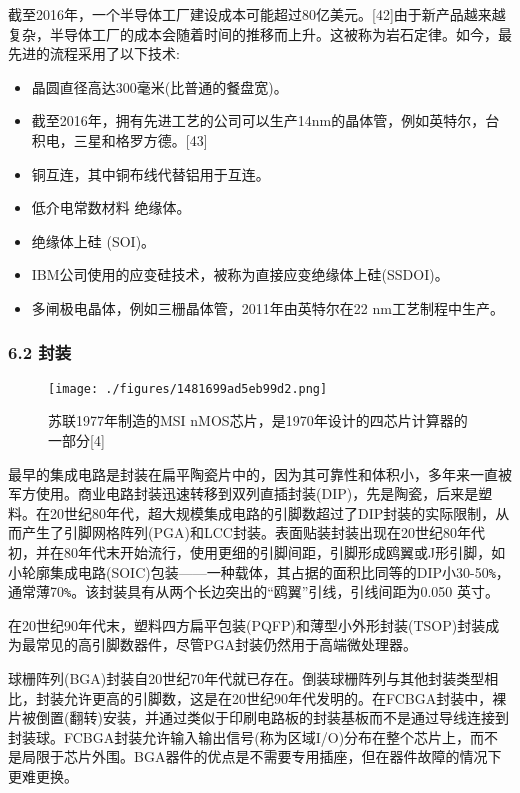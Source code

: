 截至2016年，一个半导体工厂建设成本可能超过80亿美元。[42]由于新产品越来越复杂，半导体工厂的成本会随着时间的推移而上升。这被称为岩石定律。如今，最先进的流程采用了以下技术:

\begin{itemize}
\item 晶圆直径高达300毫米(比普通的餐盘宽)。
\item 截至2016年，拥有先进工艺的公司可以生产14nm的晶体管，例如英特尔，台积电，三星和格罗方德。[43]
\item 铜互连，其中铜布线代替铝用于互连。
\item 低介电常数材料 绝缘体。
\item 绝缘体上硅 (SOI)。
\item IBM公司使用的应变硅技术，被称为直接应变绝缘体上硅(SSDOI)。
\item 多闸极电晶体，例如三栅晶体管，2011年由英特尔在22 nm工艺制程中生产。
\end{itemize}

\subsubsection{6.2 封装}

\begin{figure}[ht]
\centering
\texttt{[image: ./figures/1481699ad5eb99d2.png]}
\caption{苏联1977年制造的MSI nMOS芯片，是1970年设计的四芯片计算器的一部分[4]} \label{fig_icJCDL_7}
\end{figure}

最早的集成电路是封装在扁平陶瓷片中的，因为其可靠性和体积小，多年来一直被军方使用。商业电路封装迅速转移到双列直插封装(DIP)，先是陶瓷，后来是塑料。在20世纪80年代，超大规模集成电路的引脚数超过了DIP封装的实际限制，从而产生了引脚网格阵列(PGA)和LCC封装。表面贴装封装出现在20世纪80年代初，并在80年代末开始流行，使用更细的引脚间距，引脚形成鸥翼或J形引脚，如小轮廓集成电路(SOIC)包装——一种载体，其占据的面积比同等的DIP小30-50\verb|%|，通常薄70\verb|%|。该封装具有从两个长边突出的“鸥翼”引线，引线间距为0.050 英寸。

在20世纪90年代末，塑料四方扁平包装(PQFP)和薄型小外形封装(TSOP)封装成为最常见的高引脚数器件，尽管PGA封装仍然用于高端微处理器。

球栅阵列(BGA)封装自20世纪70年代就已存在。倒装球栅阵列与其他封装类型相比，封装允许更高的引脚数，这是在20世纪90年代发明的。在FCBGA封装中，裸片被倒置(翻转)安装，并通过类似于印刷电路板的封装基板而不是通过导线连接到封装球。FCBGA封装允许输入输出信号(称为区域I/O)分布在整个芯片上，而不是局限于芯片外围。BGA器件的优点是不需要专用插座，但在器件故障的情况下更难更换。

